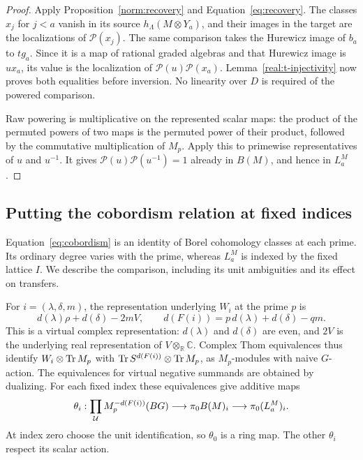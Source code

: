 \begin{proof}
Apply Proposition~\ref{norm:recovery} and
Equation~\eqref{eq:recovery}.  The classes \(x_j\) for
\(j<a\) vanish in its source
\(h_\Lambda(M\otimes Y_a)\), and their images in the target are
the localizations of \(\mathcal P(x_j)\).  The same comparison
takes the Hurewicz image of \(b_a\) to \(t g_a\).  Since it is
a map of rational graded algebras and that Hurewicz image is
\(u x_a\), its value is the localization of
\(\mathcal P(u)\mathcal P(x_a)\).  Lemma~\ref{real:t-injectivity}
now proves both equalities before inversion.  No linearity over
\(D\) is required of the powered comparison.

Raw powering is multiplicative on the represented scalar maps:
the product of the permuted powers of two maps is the permuted
power of their product, followed by the commutative multiplication
of \(M_p\).  Apply this to primewise representatives of \(u\)
and \(u^{-1}\).  It gives
\(\mathcal P(u)\mathcal P(u^{-1})=1\) already in \(B(M)\),
and hence in \(L_a^M\).
\end{proof}

\subsection{Putting the cobordism relation at fixed indices}

Equation~\eqref{eq:cobordism} is an identity of Borel cohomology
classes at each prime.  Its ordinary degree varies with the prime,
whereas \(L_a^M\) is indexed by the fixed lattice \(I\).  We
describe the comparison, including its unit ambiguities and its
effect on transfers.

For \(i=(\lambda,\delta,m)\), the representation underlying
\(W_i\) at the prime \(p\) is
\[
 d(\lambda)\rho+d(\delta)-2mV,
 \qquad
 d(F(i))=p\,d(\lambda)+d(\delta)-qm.
\]
This is a virtual complex representation: \(d(\lambda)\) and
\(d(\delta)\) are even, and \(2V\) is the underlying real
representation of \(V\otimes_{\mathbb R}\mathbb C\).
Complex Thom equivalences thus identify
\(W_i\otimes\operatorname{Tr} M_p\) with
\(\operatorname{Tr} S^{d(F(i))}\otimes\operatorname{Tr} M_p\), as \(M_p\)-modules with
naive \(G\)-action.  The equivalences for virtual negative
summands are obtained by dualizing.  For each fixed index these
equivalences give additive maps
\begin{equation}
 \theta_i:
 \prod_{\mathcal U}M_p^{-d(F(i))}(BG)
 \longrightarrow\pi_0B(M)_i
 \longrightarrow\pi_0(L_a^M)_i.
 \label{real:borel-comparison}
\end{equation}
At index zero choose the unit identification, so \(\theta_0\)
is a ring map.  The other \(\theta_i\) respect its scalar action.

